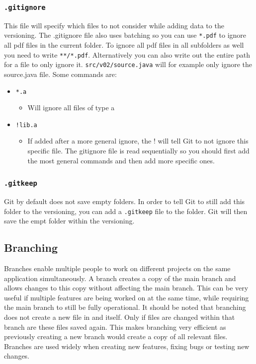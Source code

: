 \documentclass{article}
\begin{document}
	\subsubsection{\texttt{.gitignore}}
	This file will specify which files to not consider while adding data to the versioning. The .gitignore file also uses batching so you can use \texttt{*.pdf} to ignore all pdf files in the current folder. To ignore all pdf files in all subfolders as well you need to write \texttt{**/*.pdf}. Alternatively you can also write out the entire path for a file to only ignore it. \texttt{src/v02/source.java} will for example only ignore the source.java file. Some commands are:
	\begin{itemize}
		\item{\texttt{*.a}}
		\begin{itemize}
			\item{Will ignore all files of type a}
		\end{itemize}
		\item{\texttt{!lib.a}}
		\begin{itemize}
			\item{If added after a more general ignore, the ! will tell Git to not ignore this specific file. The gitignore file is read sequentially so you should first add the most general commands and then add more specific ones.}
		\end{itemize}
	\end{itemize}
	\subsubsection{\texttt{.gitkeep}}
	Git by default does not save empty folders. In order to tell Git to still add this folder to the versioning, you can add a \texttt{.gitkeep} file to the folder. Git will then save the empt folder within the versioning.
	\subsection{Branching}
	Branches enable multiple people to work on different projects on the same application simultaneously. A branch creates a copy of the main branch and allows changes to this copy without affecting the main branch. This can be very useful if multiple features are being worked on at the same time, while requiring the main branch to still be fully operational. It should be noted that branching does not create a new file in and itself. Only if files are changed within that branch are these files saved again. This makes branching very efficient as previously creating a new branch would create a copy of all relevant files. \\
	Branches are used widely when creating new features, fixing bugs or testing new changes.
\end{document}
